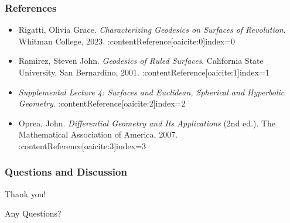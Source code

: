 \documentclass[12pt]{beamer}
\begin{document}
\begin{frame}
    \frametitle{References}
    \begin{itemize}
      \item Rigatti, Olivia Grace. \emph{Characterizing Geodesics on Surfaces of Revolution}. Whitman College, 2023. :contentReference[oaicite:0]{index=0}
      \item Ramirez, Steven John. \emph{Geodesics of Ruled Surfaces}. California State University, San Bernardino, 2001. :contentReference[oaicite:1]{index=1}
      \item \emph{Supplemental Lecture 4: Surfaces and Euclidean, Spherical and Hyperbolic Geometry}. :contentReference[oaicite:2]{index=2}
      \item Oprea, John. \emph{Differential Geometry and Its Applications} (2nd ed.). The Mathematical Association of America, 2007. :contentReference[oaicite:3]{index=3}
    \end{itemize}
\end{frame}

\begin{frame}
  \frametitle{Questions and Discussion}
  \begin{center}
    \Large{Thank you!}
    
    \vspace{0.5cm}
    \Large{Any Questions?}
  \end{center}
\end{frame}
\end{document}
